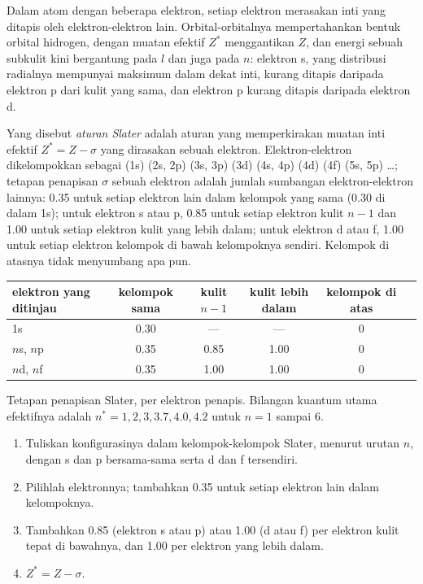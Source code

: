 Dalam atom dengan beberapa elektron, setiap elektron merasakan inti yang
ditapis oleh elektron-elektron lain. Orbital-orbitalnya mempertahankan
bentuk orbital hidrogen, dengan muatan efektif $Z^*$ menggantikan $Z$, dan
energi sebuah subkulit kini bergantung pada $l$ dan juga pada $n$: elektron
s, yang distribusi radialnya mempunyai maksimum dalam dekat inti, kurang
ditapis daripada elektron p dari kulit yang sama, dan elektron p kurang
ditapis daripada elektron d.

\begin{definition}\label{def:b2:atomic-orbitals:slater}
Yang disebut \emph{aturan Slater} adalah aturan yang
memperkirakan muatan inti efektif $Z^* = Z - \sigma$ yang dirasakan sebuah
elektron. Elektron-elektron dikelompokkan sebagai
(1s) (2s, 2p) (3s, 3p) (3d) (4s, 4p) (4d) (4f) (5s, 5p) \dots; tetapan
penapisan $\sigma$ sebuah elektron adalah jumlah sumbangan elektron-elektron
lainnya: 0.35 untuk setiap elektron lain dalam kelompok yang sama (0.30 di
dalam 1s); untuk elektron s atau p, 0.85 untuk setiap elektron kulit
$n - 1$ dan 1.00 untuk setiap elektron kulit yang lebih dalam; untuk
elektron d atau f, 1.00 untuk setiap elektron kelompok di bawah kelompoknya
sendiri. Kelompok di atasnya tidak menyumbang apa pun.
\end{definition}

\begin{omfigure}
\small
\renewcommand{\arraystretch}{1.2}
\begin{tabular}{l|ccccc}
elektron yang ditinjau & kelompok sama & kulit $n - 1$ & kulit lebih dalam & kelompok di atas \\ \hline
1s & 0.30 & --- & --- & 0 \\
$n$s, $n$p & 0.35 & 0.85 & 1.00 & 0 \\
$n$d, $n$f & 0.35 & 1.00 & 1.00 & 0 \\
\end{tabular}

\smallskip
{\small Tetapan penapisan Slater, per elektron penapis. Bilangan kuantum
utama efektifnya adalah $n^* = 1, 2, 3, 3.7, 4.0, 4.2$ untuk $n = 1$ sampai
6.}
\end{omfigure}

\begin{method}\label{met:b2:atomic-orbitals:slater}
\begin{enumerate}
  \item Tuliskan konfigurasinya dalam kelompok-kelompok Slater, menurut
        urutan $n$, dengan s dan p bersama-sama serta d dan f tersendiri.
  \item Pilihlah elektronnya; tambahkan 0.35 untuk setiap elektron lain
        dalam kelompoknya.
  \item Tambahkan 0.85 (elektron s atau p) atau 1.00 (d atau f) per elektron
        kulit tepat di bawahnya, dan 1.00 per elektron yang lebih dalam.
  \item $Z^* = Z - \sigma$.
\end{enumerate}
\end{method}

